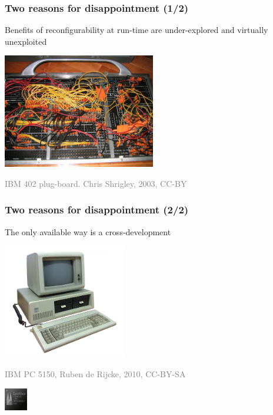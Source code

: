 \begin{frame}
\frametitle{Two reasons for disappointment (1/2)}
Benefits of reconfigurability at run-time are under-explored and
virtually unexploited
\begin{center}
  \includegraphics[height=5cm]{IBM402plugboard.Shrigley.wireside.jpg}

  \textcolor{gray}{\tiny{IBM 402 plug-board. Chris Shrigley, 2003, CC-BY}}
\end{center}
\end{frame}

\begin{frame}[t]
\frametitle{Two reasons for disappointment (2/2)}
The only available way is a cross-development
\begin{center}
  \begin{flushleft}
  \includegraphics[height=5cm]{Ibm_pc_5150.jpg}

  \textcolor{gray}{\tiny{IBM PC 5150, Ruben de Rijcke, 2010, CC-BY-SA}}
  \end{flushleft}

  \vspace{-4cm}
  \hspace*{4cm}\includegraphics[height=1cm]{CCGM1A1_front.jpg}
\end{center}
\end{frame}


